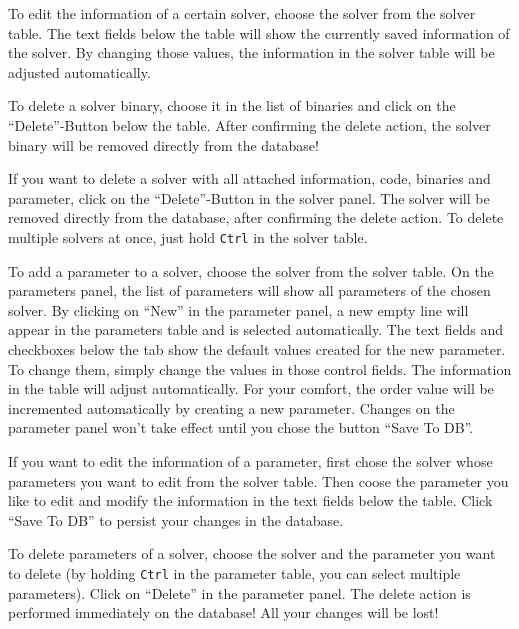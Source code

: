 To edit the information of a certain solver, choose the solver from the solver table. The text fields below the table will show the currently saved information of the solver. By changing those values, the information in the solver table will be adjusted automatically.


To delete a solver binary, choose it in the list of binaries and click on the ``Delete''-Button below the table.
\attention After confirming the delete action, the solver binary will be removed directly from the database!

If you want to delete a solver with all attached information, code, binaries and parameter, click on the ``Delete''-Button in the solver panel. The solver will be removed directly from the database, after confirming the delete action. To delete multiple solvers at once, just hold \verb|Ctrl| in the solver table.

To add a parameter to a solver, choose the solver from the solver table. On the parameters panel, the list of parameters will show all parameters of the chosen solver. By clicking on ``New'' in the parameter panel, a new empty line will appear in the parameters table and is selected automatically. The text fields and checkboxes below the tab show the default values created for the new parameter. To change them, simply change the values in those control fields. The information in the table will adjust automatically. For your comfort, the order value will be incremented automatically by creating a new parameter.
\attention Changes on the parameter panel won't take effect until you chose the button ``Save To DB''.

If you want to edit the information of a parameter, first chose the solver whose parameters you want to edit from the solver table. Then coose the parameter you like to edit and modify the information in the text fields below the table. Click ``Save To DB'' to persist your changes in the database.

To delete parameters of a solver, choose the solver and the parameter you want to delete (by holding \verb|Ctrl| in the parameter table, you can select multiple parameters). Click on ``Delete'' in the parameter panel.
\attention The delete action is performed immediately on the database! All your changes will be lost!

